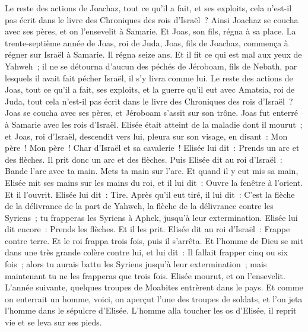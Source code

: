 \begin{multicols}{2}
Le reste des actions de Joachaz, tout ce qu'il a fait, et ses exploits, cela n'est-il pas écrit dans le livre des Chroniques des rois d'Israël~?
Ainsi Joachaz se coucha avec ses pères, et on l'ensevelit à Samarie. Et Joas, son fils, régna à sa place.
La trente-septième année de Joas, roi de Juda, Joas, fils de Joachaz, commença à régner sur Israël à Samarie. Il régna seize ans.
Et il fit ce qui est mal aux yeux de Yahweh~; il ne se détourna d'aucun des péchés de Jéroboam, fils de Nebath, par lesquels il avait fait pécher Israël, il s'y livra comme lui.
Le reste des actions de Joas, tout ce qu'il a fait, ses exploits, et la guerre qu'il eut avec Amatsia, roi de Juda, tout cela n'est-il pas écrit dans le livre des Chroniques des rois d'Israël~?
Joas se coucha avec ses pères, et Jéroboam s'assit sur son trône. Joas fut enterré à Samarie avec les rois d'Israël.
Elisée était atteint de la maladie dont il mourut~; et Joas, roi d'Israël, descendit vers lui, pleura sur son visage, en disant~: Mon père~! Mon père~! Char d'Israël et sa cavalerie~!
Elisée lui dit~: Prends un arc et des flèches. Il prit donc un arc et des flèches.
Puis Elisée dit au roi d'Israël~: Bande l'arc avec ta main. Mets ta main sur l'arc. Et quand il y eut mis sa main, Elisée mit ses mains sur les mains du roi,
et il lui dit~: Ouvre la fenêtre à l'orient. Et il l'ouvrit. Elisée lui dit~: Tire. Après qu'il eut tiré, il lui dit~: C'est la flèche de la délivrance de la part de Yahweh, la flèche de la délivrance contre les Syriens~; tu frapperas les Syriens à Aphek, jusqu'à leur extermination.
Elisée lui dit encore~: Prends les flèches. Et il les prit. Elisée dit au roi d'Israël~: Frappe contre terre. Et le roi frappa trois fois, puis il s'arrêta.
Et l'homme de Dieu se mit dans une très grande colère contre lui, et lui dit~: Il fallait frapper cinq ou six fois~; alors tu aurais battu les Syriens jusqu'à leur extermination~; mais maintenant tu ne les frapperas que trois fois.
Elisée mourut, et on l'ensevelit. L'année suivante, quelques troupes de Moabites entrèrent dans le pays.
Et comme on enterrait un homme, voici, on aperçut l'une des troupes de soldats, et l'on jeta l'homme dans le sépulcre d'Elisée. L'homme alla toucher les os d'Elisée, il reprit vie et se leva sur ses pieds.

\end{multicols}
